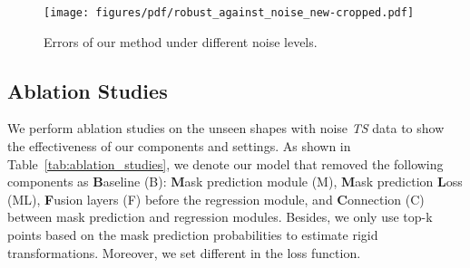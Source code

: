 \documentclass[10pt,twocolumn,letterpaper]{article}
\begin{document}
\begin{figure}[t]
    \centering
    \texttt{[image: figures/pdf/robust\_against\_noise\_new-cropped.pdf]}\\
    \caption{Errors of our method under different noise levels.}
    \vspace{-0.3cm}
    \label{fig:robustness against noise}
\end{figure} \subsection{Ablation Studies}
\label{sec:4.5}
We perform ablation studies on the unseen shapes with noise \emph{TS} data to show the effectiveness of our components and settings. As shown in Table~\ref{tab:ablation_studies}, we denote our model that removed the following components as \textbf{B}aseline (B): \textbf{M}ask prediction module (M), \textbf{M}ask prediction \textbf{L}oss (ML), \textbf{F}usion layers (F) before the regression module, and \textbf{C}onnection (C) between mask prediction and regression modules. Besides, we only use top-k points based on the mask prediction probabilities to estimate rigid transformations. Moreover, we set different  in the loss function.
\end{document}
